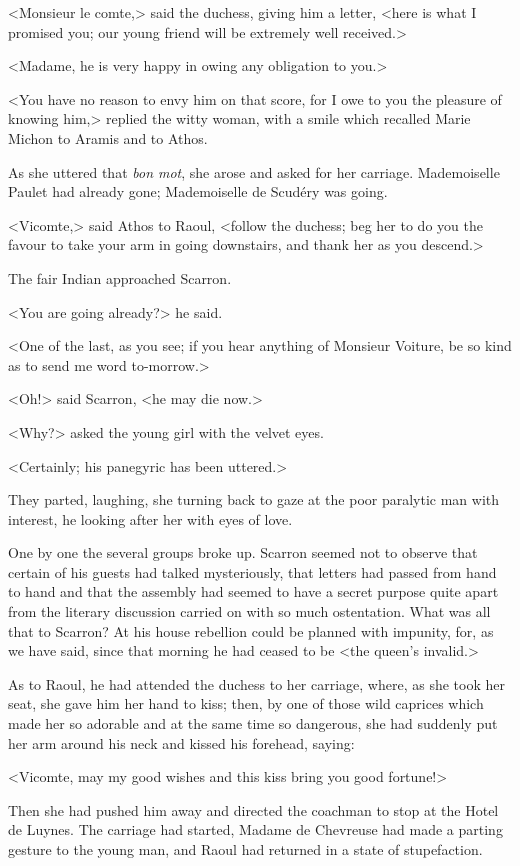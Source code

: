 <Monsieur le comte,> said the duchess, giving him a letter, <here is what I promised you; our young friend will be extremely well received.>

<Madame, he is very happy in owing any obligation to you.>

<You have no reason to envy him on that score, for I owe to you the pleasure of knowing him,> replied the witty woman, with a smile which recalled Marie Michon to Aramis and to Athos.

As she uttered that \textit{bon mot}, she arose and asked for her carriage. Mademoiselle Paulet had already gone; Mademoiselle de Scudéry was going.

<Vicomte,> said Athos to Raoul, <follow the duchess; beg her to do you the favour to take your arm in going downstairs, and thank her as you descend.>

The fair Indian approached Scarron.

<You are going already?> he said.

<One of the last, as you see; if you hear anything of Monsieur Voiture, be so kind as to send me word to-morrow.>

<Oh!> said Scarron, <he may die now.>

<Why?> asked the young girl with the velvet eyes.

<Certainly; his panegyric has been uttered.>

They parted, laughing, she turning back to gaze at the poor paralytic man with interest, he looking after her with eyes of love.

One by one the several groups broke up. Scarron seemed not to observe that certain of his guests had talked mysteriously, that letters had passed from hand to hand and that the assembly had seemed to have a secret purpose quite apart from the literary discussion carried on with so much ostentation. What was all that to Scarron? At his house rebellion could be planned with impunity, for, as we have said, since that morning he had ceased to be <the queen's invalid.>

As to Raoul, he had attended the duchess to her carriage, where, as she took her seat, she gave him her hand to kiss; then, by one of those wild caprices which made her so adorable and at the same time so dangerous, she had suddenly put her arm around his neck and kissed his forehead, saying:

<Vicomte, may my good wishes and this kiss bring you good fortune!>

Then she had pushed him away and directed the coachman to stop at the Hotel de Luynes. The carriage had started, Madame de Chevreuse had made a parting gesture to the young man, and Raoul had returned in a state of stupefaction.

